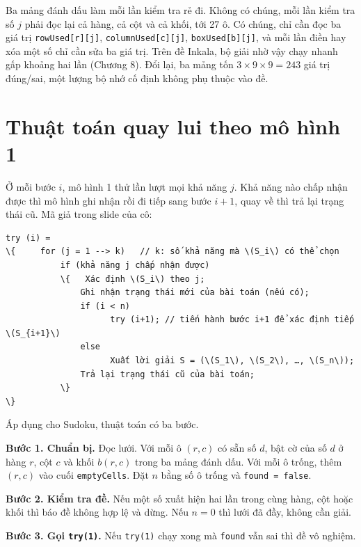 Ba mảng đánh dấu làm mỗi lần kiểm tra rẻ đi. Không có chúng, mỗi lần kiểm tra số \(j\) phải đọc lại cả hàng, cả cột và cả khối, tới 27 ô. Có chúng, chỉ cần đọc ba giá trị \texttt{rowUsed[r][j]}, \texttt{columnUsed[c][j]}, \texttt{boxUsed[b][j]}, và mỗi lần điền hay xóa một số chỉ cần sửa ba giá trị. Trên đề Inkala, bộ giải nhờ vậy chạy nhanh gấp khoảng hai lần (Chương 8). Đổi lại, ba mảng tốn \(3 \times 9 \times 9 = 243\) giá trị đúng/sai, một lượng bộ nhớ cố định không phụ thuộc vào đề.

\section{Thuật toán quay lui theo mô hình 1}

Ở mỗi bước \(i\), mô hình 1 thử lần lượt mọi khả năng \(j\). Khả năng nào chấp nhận được thì mô hình ghi nhận rồi đi tiếp sang bước \(i + 1\), quay về thì trả lại trạng thái cũ. Mã giả trong slide của cô:

\begin{Verbatim}[frame=single, commandchars=\\\{\}, codes={\catcode`\_=8}, fontsize=\small]
try (i) =
\{     for (j = 1 --> k)   // k: số khả năng mà \(S_i\) có thể chọn
           if (khả năng j chấp nhận được)
           \{   Xác định \(S_i\) theo j;
               Ghi nhận trạng thái mới của bài toán (nếu có);
               if (i < n)
                     try (i+1); // tiến hành bước i+1 để xác định tiếp \(S_{i+1}\)
               else
                     Xuất lời giải S = (\(S_1\), \(S_2\), …, \(S_n\));
               Trả lại trạng thái cũ của bài toán;
           \}
\}
\end{Verbatim}

Áp dụng cho Sudoku, thuật toán có ba bước.

\textbf{Bước 1. Chuẩn bị.} Đọc lưới. Với mỗi ô \((r, c)\) có sẵn số \(d\), bật cờ của số \(d\) ở hàng \(r\), cột \(c\) và khối \(b(r, c)\) trong ba mảng đánh dấu. Với mỗi ô trống, thêm \((r, c)\) vào cuối \texttt{emptyCells}. Đặt \(n\) bằng số ô trống và \texttt{found = false}.

\textbf{Bước 2. Kiểm tra đề.} Nếu một số xuất hiện hai lần trong cùng hàng, cột hoặc khối thì báo đề không hợp lệ và dừng. Nếu \(n = 0\) thì lưới đã đầy, không cần giải.

\textbf{Bước 3. Gọi \texttt{try(1)}.} Nếu \texttt{try(1)} chạy xong mà \texttt{found} vẫn sai thì đề vô nghiệm.

